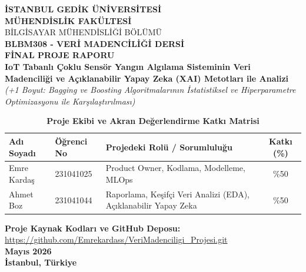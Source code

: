 \documentclass[12pt,a4paper]{article}
\begin{document}
\shorthandoff{=} %

\sloppy %

\begin{titlepage}
    \centering
    \vspace*{1cm}
    {\LARGE \bfseries İSTANBUL GEDİK ÜNİVERSİTESİ}\\[0.6cm]
    {\Large \bfseries MÜHENDİSLİK FAKÜLTESİ}\\[0.3cm]
    {\Large BİLGİSAYAR MÜHENDİSLİĞİ BÖLÜMÜ}\\[2.5cm]
    
    {\Large \bfseries BLBM308 - VERİ MADENCİLİĞİ DERSİ}\\[1cm]
    {\huge \bfseries FİNAL PROJE RAPORU}\\[2cm]
    
    {\Large \bfseries IoT Tabanlı Çoklu Sensör Yangın Algılama Sisteminin Veri Madenciliği ve Açıklanabilir Yapay Zeka (XAI) Metotları ile Analizi}\\[1.5cm]
    {\large \textit{(+1 Boyut: Bagging ve Boosting Algoritmalarının İstatistiksel ve Hiperparametre Optimizasyonu ile Karşılaştırılması)}}\\[2.5cm]
    
    \begin{table}[H]
    \centering
    \caption{\bfseries Proje Ekibi ve Akran Değerlendirme Katkı Matrisi}
    \vspace{0.3cm}
    \renewcommand{\arraystretch}{1.3} 
    \begin{tabularx}{\textwidth}{l l X c}
    \toprule
    \textbf{Adı Soyadı} & \textbf{Öğrenci No} & \textbf{Projedeki Rolü / Sorumluluğu} & \textbf{Katkı (\%)} \\
    \midrule
    Emre Kardaş & 231041025 & Product Owner, Kodlama, Modelleme, MLOps & \%50 \\
    Ahmet Boz & 231041044 & Raporlama, Keşifçi Veri Analizi (EDA), Açıklanabilir Yapay Zeka & \%50 \\
    \bottomrule
    \end{tabularx}
    \label{tab:katki_matrisi}
    \end{table}

    \vfill
    \vspace{0.5cm}
    \textbf{Proje Kaynak Kodları ve GitHub Deposu:}\\
    \url{https://github.com/Emrekardass/VeriMadenciligi_Projesi.git}\\[1cm]
    {\large \textbf{Mayıs 2026}}\\[0.2cm]
    {\large \textbf{İstanbul, Türkiye}}
\end{titlepage}
\end{document}
